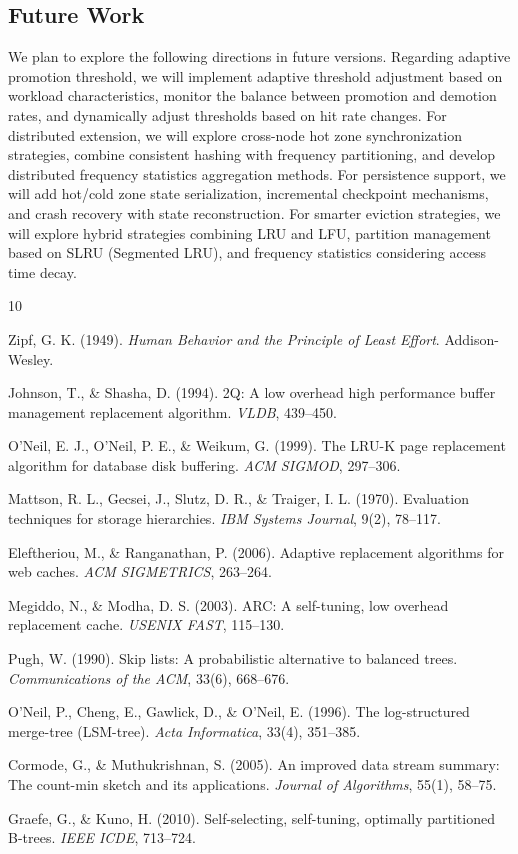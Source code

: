 \documentclass[11pt,a4paper]{article}
\begin{document}
\subsection{Future Work}

We plan to explore the following directions in future versions. Regarding adaptive promotion threshold, we will implement adaptive threshold adjustment based on workload characteristics, monitor the balance between promotion and demotion rates, and dynamically adjust thresholds based on hit rate changes. For distributed extension, we will explore cross-node hot zone synchronization strategies, combine consistent hashing with frequency partitioning, and develop distributed frequency statistics aggregation methods. For persistence support, we will add hot/cold zone state serialization, incremental checkpoint mechanisms, and crash recovery with state reconstruction. For smarter eviction strategies, we will explore hybrid strategies combining LRU and LFU, partition management based on SLRU (Segmented LRU), and frequency statistics considering access time decay.


\begin{thebibliography}{10}

Zipf, G. K. (1949). \textit{Human Behavior and the Principle of Least Effort}. Addison-Wesley.

Johnson, T., \& Shasha, D. (1994). 2Q: A low overhead high performance buffer management replacement algorithm. \textit{VLDB}, 439--450.

O'Neil, E. J., O'Neil, P. E., \& Weikum, G. (1999). The LRU-K page replacement algorithm for database disk buffering. \textit{ACM SIGMOD}, 297--306.

Mattson, R. L., Gecsei, J., Slutz, D. R., \& Traiger, I. L. (1970). Evaluation techniques for storage hierarchies. \textit{IBM Systems Journal}, 9(2), 78--117.

Eleftheriou, M., \& Ranganathan, P. (2006). Adaptive replacement algorithms for web caches. \textit{ACM SIGMETRICS}, 263--264.

Megiddo, N., \& Modha, D. S. (2003). ARC: A self-tuning, low overhead replacement cache. \textit{USENIX FAST}, 115--130.

Pugh, W. (1990). Skip lists: A probabilistic alternative to balanced trees. \textit{Communications of the ACM}, 33(6), 668--676.

O'Neil, P., Cheng, E., Gawlick, D., \& O'Neil, E. (1996). The log-structured merge-tree (LSM-tree). \textit{Acta Informatica}, 33(4), 351--385.

Cormode, G., \& Muthukrishnan, S. (2005). An improved data stream summary: The count-min sketch and its applications. \textit{Journal of Algorithms}, 55(1), 58--75.

Graefe, G., \& Kuno, H. (2010). Self-selecting, self-tuning, optimally partitioned B-trees. \textit{IEEE ICDE}, 713--724.

\end{thebibliography}
\end{document}

